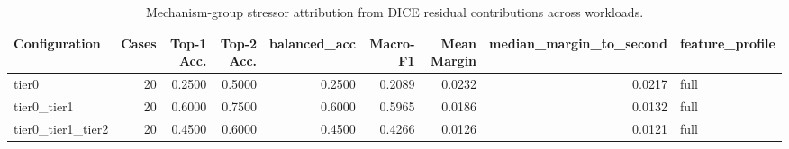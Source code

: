 \begin{table}[t]
\centering
\caption{Mechanism-group stressor attribution from DICE residual contributions across workloads.}
\label{tab:dice_stressor_diagnosis}
\footnotesize
\begin{tabular}{lrrrrrrrl}
\toprule
Configuration & Cases & Top-1 Acc. & Top-2 Acc. & balanced_acc & Macro-F1 & Mean Margin & median_margin_to_second & feature_profile \\
\midrule
tier0 & 20 & 0.2500 & 0.5000 & 0.2500 & 0.2089 & 0.0232 & 0.0217 & full \\
tier0_tier1 & 20 & 0.6000 & 0.7500 & 0.6000 & 0.5965 & 0.0186 & 0.0132 & full \\
tier0_tier1_tier2 & 20 & 0.4500 & 0.6000 & 0.4500 & 0.4266 & 0.0126 & 0.0121 & full \\
\bottomrule
\end{tabular}

\end{table}
